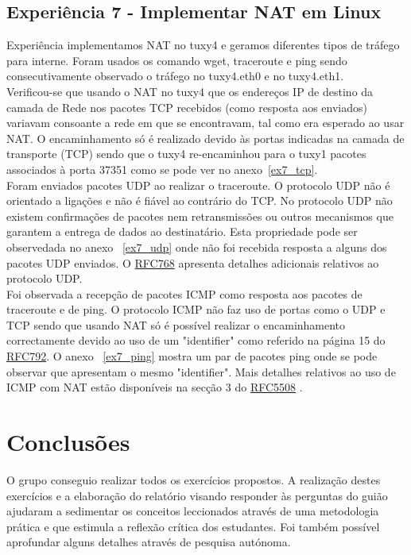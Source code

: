 \documentclass[11pt,a4paper,reqno]{report}
\numberwithin{equation}{section}
\begin{document}
\section{Experiência 7 - Implementar NAT em Linux}

Experiência implementamos NAT no tuxy4 e geramos diferentes tipos de tráfego para interne. Foram usados os comando wget, traceroute e ping sendo consecutivamente observado o tráfego no tuxy4.eth0 e no tuxy4.eth1.\\

Verificou-se que usando o NAT no tuxy4 que os endereços IP de destino da camada de Rede nos pacotes TCP recebidos (como resposta aos enviados) variavam consoante a rede em que se encontravam, tal como era esperado ao usar NAT. O encaminhamento só é realizado devido às portas indicadas na camada de transporte (TCP) sendo que o tuxy4 re-encaminhou para o tuxy1 pacotes associados à porta 37351 como se pode ver no anexo~\ref{ex7_tcp}.\\

Foram enviados pacotes UDP ao realizar o traceroute. O protocolo UDP não é orientado a ligações e não é fiável ao contrário do TCP. No protocolo UDP não existem confirmações de pacotes nem retransmissões ou outros mecanismos que garantem a entrega de dados ao destinatário. Esta propriedade pode ser observedada no anexo ~\ref{ex7_udp} onde não foi recebida resposta a alguns dos pacotes UDP enviados. O \href{https://www.ietf.org/rfc/rfc768.txt}{RFC768} apresenta detalhes adicionais relativos ao protocolo UDP.\\

Foi observada a recepção de pacotes ICMP como resposta aos pacotes de traceroute e de ping. O protocolo ICMP não faz uso de portas como o UDP e TCP sendo que usando NAT só é possível realizar o encaminhamento correctamente devido ao uso de um "identifier" como referido na página 15 do \href{https://www.ietf.org/rfc/rfc792.txt}{RFC792}. O anexo ~\ref{ex7_ping} mostra um par de pacotes ping onde se pode observar que apresentam o mesmo "identifier". Mais detalhes relativos ao uso de ICMP com NAT estão disponíveis na secção 3 do \href{https://www.ietf.org/rfc/rfc5508.txt}{RFC5508} . 

\chapter{Conclusões}

O grupo conseguio realizar todos os exercícios propostos. A realização destes exercícios e a elaboração do relatório visando responder às perguntas do guião ajudaram a sedimentar os conceitos leccionados através de uma metodologia prática e que estimula a reflexão crítica dos estudantes. Foi também possível aprofundar alguns detalhes através de pesquisa autónoma. 
\end{document}
